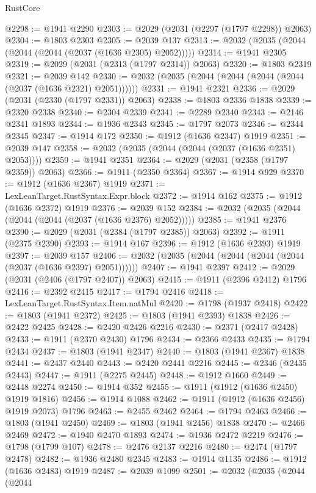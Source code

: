 \begin{lexlean}{RustCore}
\begin{coremodule}
@2298 := @1941 @2290
@2303 := @2029 (@2031 (@2297 (@1797 @2298)) @2063)
@2304 := @1803 @2303
@2305 := @2039 @137
@2313 := @2032 (@2035 (@2044 (@2044 (@2044 (@2037 (@1636 @2305) @2052)))))
@2314 := @1941 @2305
@2319 := @2029 (@2031 (@2313 (@1797 @2314)) @2063)
@2320 := @1803 @2319
@2321 := @2039 @142
@2330 := @2032 (@2035 (@2044 (@2044 (@2044 (@2044 (@2037 (@1636 @2321) @2051))))))
@2331 := @1941 @2321
@2336 := @2029 (@2031 (@2330 (@1797 @2331)) @2063)
@2338 := @1803 @2336 @1838
@2339 := @2320 @2338
@2340 := @2304 @2339
@2341 := @2289 @2340
@2343 := @2146 @2341 @1893
@2344 := @1936 @2343
@2345 := @1797 @2073
@2346 := @2344 @2345
@2347 := @1914 @172
@2350 := @1912 (@1636 @2347) @1919
@2351 := @2039 @147
@2358 := @2032 (@2035 (@2044 (@2044 (@2037 (@1636 @2351) @2053))))
@2359 := @1941 @2351
@2364 := @2029 (@2031 (@2358 (@1797 @2359)) @2063)
@2366 := @1911 (@2350 @2364)
@2367 := @1914 @929
@2370 := @1912 (@1636 @2367) @1919
@2371 := LexLeanTarget.RustSyntax.Expr.block
@2372 := @1914 @162
@2375 := @1912 (@1636 @2372) @1919
@2376 := @2039 @152
@2384 := @2032 (@2035 (@2044 (@2044 (@2044 (@2037 (@1636 @2376) @2052)))))
@2385 := @1941 @2376
@2390 := @2029 (@2031 (@2384 (@1797 @2385)) @2063)
@2392 := @1911 (@2375 @2390)
@2393 := @1914 @167
@2396 := @1912 (@1636 @2393) @1919
@2397 := @2039 @157
@2406 := @2032 (@2035 (@2044 (@2044 (@2044 (@2044 (@2037 (@1636 @2397) @2051))))))
@2407 := @1941 @2397
@2412 := @2029 (@2031 (@2406 (@1797 @2407)) @2063)
@2415 := @1911 (@2396 @2412) @1796
@2416 := @2392 @2415
@2417 := @1794 @2416
@2418 := LexLeanTarget.RustSyntax.Item.natMul
@2420 := @1798 (@1937 @2418)
@2422 := @1803 (@1941 @2372)
@2425 := @1803 (@1941 @2393) @1838
@2426 := @2422 @2425
@2428 := @2420 @2426 @2216
@2430 := @2371 (@2417 @2428)
@2433 := @1911 (@2370 @2430) @1796
@2434 := @2366 @2433
@2435 := @1794 @2434
@2437 := @1803 (@1941 @2347)
@2440 := @1803 (@1941 @2367) @1838
@2441 := @2437 @2440
@2443 := @2420 @2441 @2216
@2445 := @2346 (@2435 @2443)
@2447 := @1911 (@2275 @2445)
@2448 := @1912 @1660
@2449 := @2448 @2274
@2450 := @1914 @352
@2455 := @1911 (@1912 (@1636 @2450) @1919 @1816)
@2456 := @1914 @1088
@2462 := @1911 (@1912 (@1636 @2456) @1919 @2073) @1796
@2463 := @2455 @2462
@2464 := @1794 @2463
@2466 := @1803 (@1941 @2450)
@2469 := @1803 (@1941 @2456) @1838
@2470 := @2466 @2469
@2472 := @1940 @2470 @1893
@2474 := @1936 @2472 @2219
@2476 := @1798 (@1799 @107)
@2478 := @2476 @2137 @2216
@2480 := @2474 (@1797 @2478)
@2482 := @1936 @2480 @2345
@2483 := @1914 @1135
@2486 := @1912 (@1636 @2483) @1919
@2487 := @2039 @1099
@2501 := @2032
    (@2035
      (@2044
        (@2044

\end{coremodule}
\end{lexlean}
